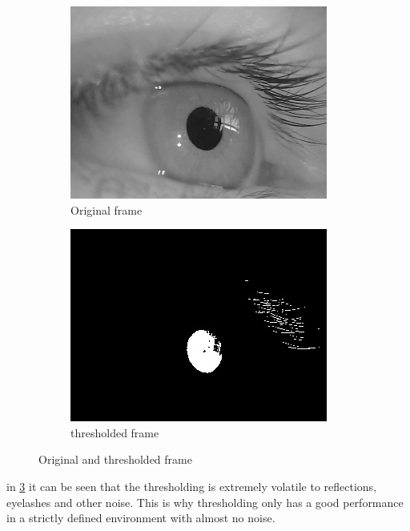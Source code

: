\begin{figure}[ht]
    \centering
    \begin{subfigure}{.5\textwidth}
      \centering
      \includegraphics[width=.9\linewidth]{plots/orig_canny.png}
      \caption{Original frame}
      \label{fig:th_orig}
    \end{subfigure}%
    \begin{subfigure}{.5\textwidth}
      \centering
      \includegraphics[width=.9\linewidth]{plots/thresholded.jpg}
      \caption{thresholded frame}
      \label{fig:th_thres}
    \end{subfigure}
    \caption{Original and thresholded frame}
    \label{fig:simple_thresh}
\end{figure}
in \ref{fig:simple_thresh} it can be seen that the thresholding is extremely volatile to reflections, eyelashes and other noise. This is why thresholding only has a good performance in a strictly defined environment with almost no noise. 

